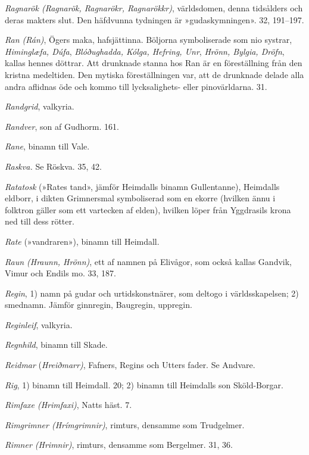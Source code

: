 \emph{Ragnarök (Ragnarök, Ragnarökr, Ragnarökkr)}, världsdomen, denna
tidsålders och deras makters slut. Den häfdvunna tydningen är
»gudaskymningen». 32, 191--197.

\emph{Ran (Rán)}, Ögers maka, hafsjättinna. Böljorna symboliserade som
nio systrar, \emph{Himinglæfa, Dúfa}, \emph{Blóðughadda, Kólga, Hefring,
Unr}, \emph{Hrönn, Bylgia, Dröfn}, kallas hennes döttrar. Att drunknade
stanna hos Ran är en föreställning från den kristna medeltiden. Den
mytiska
\protect\hypertarget{lb1625905.xhtmlux5cux23start235}{}{}\protect\hypertarget{lb1625905.xhtmlux5cux23start235-a}{}{}\protect\hypertarget{lb1625905.xhtmlux5cux23start235-b}{}{}\protect\hypertarget{lb1625905.xhtmlux5cux23start235-c}{}{}\protect\hypertarget{lb1625905.xhtmlux5cux23start235-d}{}{}
föreställningen var, att de drunknade delade alla andra aflidnas öde och
kommo till lycksalighets- eller pinovärldarna. 31.

\emph{Randgrid}, valkyria.

\emph{Randver}, son af Gudhorm. 161.

\emph{Rane}, binamn till Vale.

\emph{Raskva.} Se Röskva. 35, 42.

\emph{Ratatosk} (»Rates tand», jämför Heimdalls binamn Gullentanne),
Heimdalls eldborr, i dikten Grimnersmal symboliserad som en ekorre
(hvilken ännu i folktron gäller som ett vartecken af elden), hvilken
löper från Yggdrasils krona ned till dess rötter.

\emph{Rate} (»vandraren»), binamn till Heimdall.

\emph{Raun (Hraunn, Hrönn)}, ett af namnen på Elivågor, som också kallas
Gandvik, Vimur och Endils mo. 33, 187.

\emph{Regin}, 1) namn på gudar och urtidskonstnärer, som deltogo i
världsskapelsen; 2) smednamn. Jämför ginnregin, Baugregin, uppregin.

\emph{Reginleif}, valkyria.

\emph{Regnhild}, binamn till Skade.

\emph{Reidmar} (\emph{Hreiðmarr)}, Fafners, Regins och Utters fader. Se
Andvare.

\emph{Rig}, 1) binamn till Heimdall. 20; 2) binamn till Heimdalls son
Sköld-Borgar.

\emph{Rimfaxe (Hrimfaxi)}, Natts häst. 7.

\emph{Rimgrimner (Hrímgrimnir)}, rimturs, densamme som Trudgelmer.

\emph{Rimner (Hrimnir)}, rimturs, densamme som Bergelmer. 31, 36.


